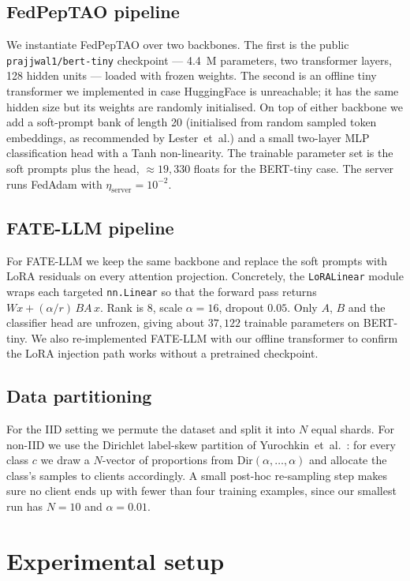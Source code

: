 \documentclass[journal]{IEEEtran}
\begin{document}
\subsection{FedPepTAO pipeline}
We instantiate FedPepTAO over two backbones. The first is the public
\texttt{prajjwal1/bert-tiny} checkpoint --- 4.4~M parameters, two
transformer layers, 128 hidden units --- loaded with frozen weights. The
second is an offline tiny transformer we implemented in case
HuggingFace is unreachable; it has the same hidden size but its weights
are randomly initialised. On top of either backbone we add a soft-prompt
bank of length 20 (initialised from random sampled token embeddings, as
recommended by Lester~et~al.) and a small two-layer MLP classification
head with a Tanh non-linearity. The trainable parameter set is the soft
prompts plus the head, $\approx 19{,}330$ floats for the BERT-tiny case.
The server runs FedAdam with $\eta_{\text{server}} = 10^{-2}$.

\subsection{FATE-LLM pipeline}
For FATE-LLM we keep the same backbone and replace the soft prompts with
LoRA residuals on every attention projection. Concretely, the
\texttt{LoRALinear} module wraps each targeted \texttt{nn.Linear} so that
the forward pass returns $W x + (\alpha / r)\,B A\,x$. Rank is 8, scale
$\alpha = 16$, dropout $0.05$. Only $A$, $B$ and the classifier head are
unfrozen, giving about $37{,}122$ trainable parameters on BERT-tiny. We
also re-implemented FATE-LLM with our offline transformer to confirm the
LoRA injection path works without a pretrained checkpoint.

\subsection{Data partitioning}
For the IID setting we permute the dataset and split it into $N$ equal
shards. For non-IID we use the Dirichlet label-skew partition of
Yurochkin~et~al.\ \cite{yurochkin2019}: for every class $c$ we draw a
$N$-vector of proportions from $\mathrm{Dir}(\alpha,\ldots,\alpha)$ and
allocate the class's samples to clients accordingly. A small post-hoc
re-sampling step makes sure no client ends up with fewer than four
training examples, since our smallest run has $N=10$ and $\alpha=0.01$.


\section{Experimental setup}
\label{sec:exp}
\end{document}
